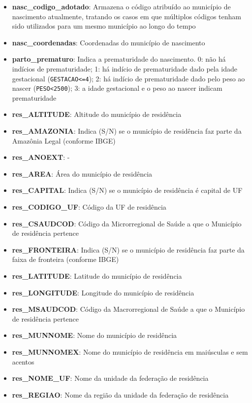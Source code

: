\documentclass[
]{article}
\begin{document}
\begin{itemize}
\item
  \textbf{nasc\_codigo\_adotado}: Armazena o código atribuído ao
  município de nascimento atualmente, tratando os casos em que múltiplos
  códigos tenham sido utilizados para um mesmo município ao longo do
  tempo
\item
  \textbf{nasc\_coordenadas}: Coordenadas do município de nascimento
\item
  \textbf{parto\_prematuro}: Indica a prematuridade do nascimento. 0:
  não há indícios de prematuridade; 1: há indício de prematuridade dado
  pela idade gestacional (\texttt{GESTACAO\textless{}=4}); 2: há indício
  de prematuridade dado pelo peso ao nascer
  (\texttt{PESO\textless{}2500}); 3: a idade gestacional e o peso ao
  nascer indicam prematuridade
\item
  \textbf{res\_ALTITUDE}: Altitude do município de residência
\item
  \textbf{res\_AMAZONIA}: Indica (S/N) se o município de residência faz
  parte da Amazônia Legal (conforme IBGE)
\item
  \textbf{res\_ANOEXT}: -
\item
  \textbf{res\_AREA}: Área do município de residência
\item
  \textbf{res\_CAPITAL}: Indica (S/N) se o município de residência é
  capital de UF
\item
  \textbf{res\_CODIGO\_UF}: Código da UF de residência
\item
  \textbf{res\_CSAUDCOD}: Código da Microrregional de Saúde a que o
  Município de residência pertence
\item
  \textbf{res\_FRONTEIRA}: Indica (S/N) se o município de residência faz
  parte da faixa de fronteira (conforme IBGE)
\item
  \textbf{res\_LATITUDE}: Latitude do município de residência
\item
  \textbf{res\_LONGITUDE}: Longitude do município de residência
\item
  \textbf{res\_MSAUDCOD}: Código da Macrorregional de Saúde a que o
  Município de residência pertence
\item
  \textbf{res\_MUNNOME}: Nome do município de residência
\item
  \textbf{res\_MUNNOMEX}: Nome do município de residência em maiúsculas
  e sem acentos
\item
  \textbf{res\_NOME\_UF}: Nome da unidade da federação de residência
\item
  \textbf{res\_REGIAO}: Nome da região da unidade da federação de
  residência

\end{itemize}
\end{document}
